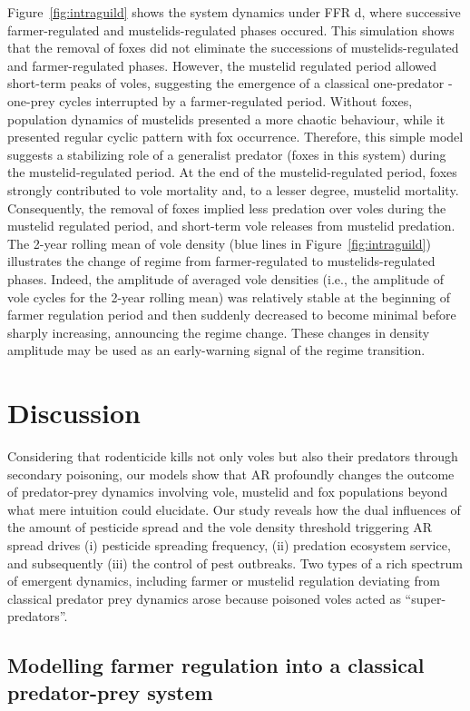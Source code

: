 \documentclass[11pt]{article}
\begin{document}
Figure~\ref{fig:intraguild} shows the system dynamics under FFR d, where successive farmer-regulated and mustelids-regulated phases occured. This simulation shows that the removal of foxes did not eliminate the successions of mustelids-regulated and farmer-regulated phases. However, the mustelid regulated period allowed short-term peaks of voles, suggesting the emergence of a classical one-predator - one-prey cycles interrupted by a farmer-regulated period. Without foxes, population dynamics of mustelids presented a more chaotic behaviour, while it presented regular cyclic pattern with fox occurrence. Therefore, this simple model suggests a stabilizing role of a generalist predator (foxes in this system) during the mustelid-regulated period. At the end of the mustelid-regulated period, foxes strongly contributed to vole mortality and, to a lesser degree, mustelid mortality. Consequently, the removal of foxes implied less predation over voles during the mustelid regulated period, and short-term vole releases from mustelid predation. The 2-year rolling mean of vole density (blue lines in Figure~\ref{fig:intraguild}) illustrates the change of regime from farmer-regulated to mustelids-regulated phases. Indeed, the amplitude of averaged vole densities (i.e., the amplitude of vole cycles for the 2-year rolling mean) was relatively stable at the beginning of farmer regulation period and then suddenly decreased to become minimal before sharply increasing, announcing the regime change. These changes in density amplitude may be used as an early-warning signal of the regime transition. 

\section{Discussion} 
Considering that rodenticide kills not only voles but also their predators through secondary poisoning, our models show that AR profoundly changes the outcome of predator-prey dynamics involving vole, mustelid and fox populations beyond what mere intuition could elucidate. Our study reveals how the dual influences of the amount of pesticide spread and the vole density threshold triggering AR spread drives (i) pesticide spreading frequency, (ii) predation ecosystem service, and subsequently (iii) the control of pest outbreaks. Two types of a rich spectrum of emergent dynamics, including farmer or mustelid regulation deviating from classical predator prey dynamics arose because poisoned voles acted as “super-predators”. 

\subsection{Modelling farmer regulation into a classical predator-prey system}
 
\end{document}
